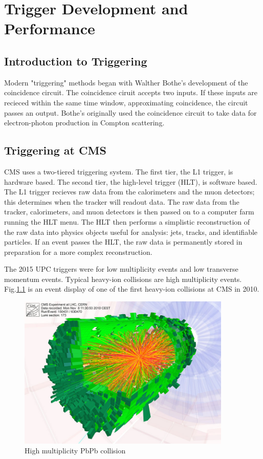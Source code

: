 
\chapter{Trigger Development and Performance}

\section{Introduction to Triggering}

Modern "triggering" methods began with Walther Bothe's development of the coincidence circuit. The coincidence ciruit accepts two inputs. If these inputs are recieced within the same time window, approximating coincidence, the circuit passes an output. Bothe's originally used the coincidence circuit to take data for electron-photon production in Compton scattering.

\section{Triggering at CMS}
CMS uses a two-tiered triggering system. The first tier, the L1 trigger, is hardware based. The second tier, the high-level trigger (HLT), is software based. The L1 trigger recieves raw data from the calorimeters and the muon detectors; this determines when the tracker will readout data. The raw data from the tracker, calorimeters, and muon detectors is then passed on to a computer farm running the HLT menu. The HLT then performs a simplistic reconstruction of the raw data into physics objects useful for analysis: jets, tracks, and identifiable particles. If an event passes the HLT, the raw data is permanently stored in preparation for a more complex reconstruction. 

The 2015 UPC triggers were for low multiplicity events and low transverse momentum events. Typical heavy-ion collisions are high multiplicity events. Fig.\ref{fig:eventdisplayHI} is an event display of one of the first heavy-ion collisions at CMS in 2010.

\begin{figure}[h!]
\begin{centering}
\includegraphics[width=4in]{Chapter3/importfigs/cms_firstleadcoll.jpg}
\par\end{centering}
\caption{High multiplicity PbPb collision \label{fig:eventdisplayHI}}
\end{figure}

